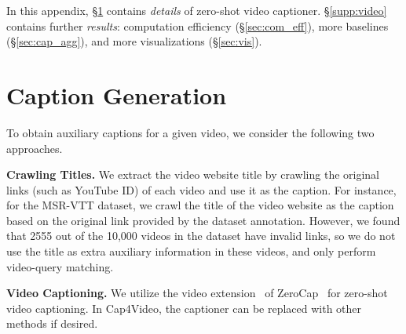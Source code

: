 \documentclass[10pt,twocolumn,letterpaper]{article}
\begin{document}
{\small


}

\clearpage
{}




\appendix
\setcounter{table}{0}
\setcounter{figure}{0}
\renewcommand{\thetable}{A.\arabic{table}}
\renewcommand{\thefigure}{A.\arabic{figure}}

In this appendix, 
\S\ref{supp:details} contains \textit{details} of zero-shot video captioner.
\S\ref{supp:video} contains further \textit{results}: computation efficiency (\S\ref{sec:com_eff}), more baselines (\S\ref{sec:cap_agg}), and more visualizations (\S\ref{sec:vis}).



\section{Caption Generation}\label{supp:details}
To obtain auxiliary captions for a given video, we consider the following two approaches.


\textbf{Crawling Titles.} We extract the video website title by crawling the original links (such as YouTube ID) of each video and use it as the caption. For instance, for the MSR-VTT dataset, we crawl the title of the video website as the caption based on the original link provided by the dataset annotation. However, we found that 2555 out of the 10,000 videos in the dataset have invalid links, so we do not use the title as extra auxiliary information in these videos, and only perform video-query matching. 


\textbf{Video Captioning.} We utilize the video extension~\cite{videocap} of ZeroCap~\cite{tewel2022zerocap} for zero-shot video captioning. 
In Cap4Video, the captioner can be replaced with other methods if desired.
\end{document}
